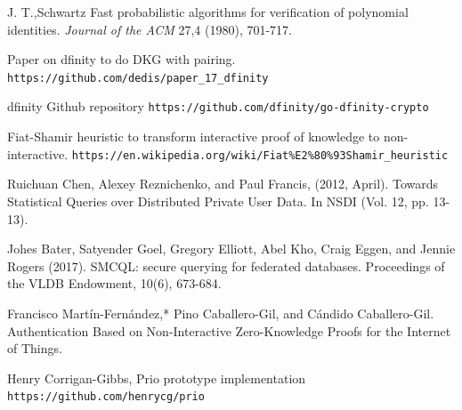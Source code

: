 \documentclass{article}
\begin{document}
\begin{thebibliography}{9}
J. T.,Schwartz Fast probabilistic algorithms for verification of polynomial identities. \textit{Journal of the ACM} 27,4 (1980), 701-717.


Paper on dfinity to do DKG with pairing.
\texttt{https://github.com/dedis/paper\_17\_dfinity}

dfinity Github repository
\texttt{https://github.com/dfinity/go-dfinity-crypto}

Fiat-Shamir heuristic to transform interactive proof of knowledge to non-interactive.
\texttt{https://en.wikipedia.org/wiki/Fiat\%E2\%80\%93Shamir\_heuristic}

Ruichuan Chen, Alexey Reznichenko, and Paul Francis, (2012, April). Towards Statistical Queries over Distributed Private User Data. In NSDI (Vol. 12, pp. 13-13).


Johes Bater, Satyender Goel, Gregory Elliott, Abel Kho, Craig Eggen, and Jennie Rogers (2017). SMCQL: secure querying for federated databases. Proceedings of the VLDB Endowment, 10(6), 673-684.

Francisco Martín-Fernández,* Pino Caballero-Gil, and Cándido Caballero-Gil. Authentication Based on Non-Interactive Zero-Knowledge Proofs for the Internet of Things.

Henry Corrigan-Gibbs, Prio prototype implementation\\
\texttt{https://github.com/henrycg/prio}
\end{thebibliography}
\end{document}

